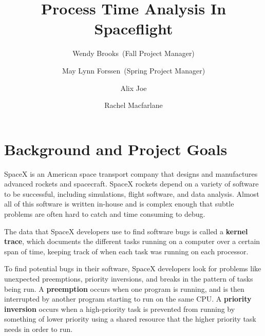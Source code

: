 \documentclass{hmcclinic}
\title{Process Time Analysis In Spaceflight}
\author{Wendy Brooks~(Fall Project Manager) \and May Lynn Forssen~(Spring Project Manager) \and Alix Joe \and
Rachel Macfarlane}
\begin{document}

\maketitle
 
\tableofcontents



\chapter{Background and Project Goals} %

SpaceX is an American space transport company that designs and manufactures
advanced rockets and spacecraft. SpaceX rockets depend on a variety of software
to be successful, including simulations, flight software, and data analysis.
Almost all of this software is written in-house and is complex enough that subtle
problems are often hard to catch and time consuming to debug.

The data that SpaceX developers use to find software bugs is called
a {\bf kernel trace}, which documents the different tasks running on a computer over a
certain span of time, keeping track of when each task was running on each processor. 

To find potential bugs in their software, SpaceX developers look for
problems like unexpected preemptions, priority inversions, and breaks in the
pattern of tasks being run.
 A {\bf preemption} occurs when one program is running, and
is then interrupted by another program starting to run on the same CPU. 
A {\bf priority
inversion} occurs when a high-priority task is prevented from running by something of
lower priority using a shared resource that the higher priority task needs in
order to run. 
\end{document}
